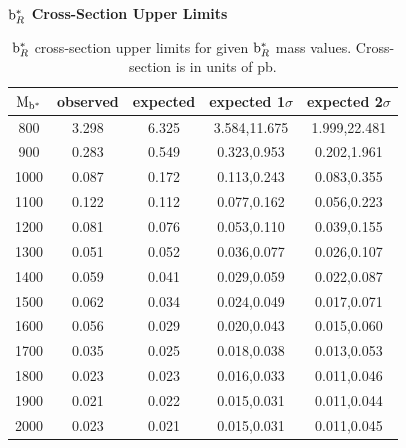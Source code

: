 \begin{table}
\begin{center}
\bf{$\mathrm{b}^{*}_R$ Cross-Section Upper Limits}\\
\begin{tabular}{|c||c|c|c|c|}
\hline
\bf{$\mathrm{M_{\mathrm{b}^{*}}}$} & \bf{observed}  & \bf{expected} & \bf{expected 1$\sigma$}  & \bf{expected 2$\sigma$} \\
\hline
\hline
800 & 3.298 & 6.325 & 3.584,11.675 & 1.999,22.481\\ 
\hline
900 & 0.283 & 0.549 & 0.323,0.953 & 0.202,1.961\\ 
\hline
1000 & 0.087 & 0.172 & 0.113,0.243 & 0.083,0.355\\ 
\hline
1100 & 0.122 & 0.112 & 0.077,0.162 & 0.056,0.223\\ 
\hline
1200 & 0.081 & 0.076 & 0.053,0.110 & 0.039,0.155\\ 
\hline
1300 & 0.051 & 0.052 & 0.036,0.077 & 0.026,0.107\\ 
\hline
1400 & 0.059 & 0.041 & 0.029,0.059 & 0.022,0.087\\ 
\hline
1500 & 0.062 & 0.034 & 0.024,0.049 & 0.017,0.071\\ 
\hline
1600 & 0.056 & 0.029 & 0.020,0.043 & 0.015,0.060\\ 
\hline
1700 & 0.035 & 0.025 & 0.018,0.038 & 0.013,0.053\\ 
\hline
1800 & 0.023 & 0.023 & 0.016,0.033 & 0.011,0.046\\ 
\hline
1900 & 0.021 & 0.022 & 0.015,0.031 & 0.011,0.044\\ 
\hline
2000 & 0.023 & 0.021 & 0.015,0.031 & 0.011,0.045\\ 
\hline
\end{tabular}
\end{center}
\caption{$\mathrm{b}^{*}_R$ cross-section upper limits for given $\mathrm{b}^{*}_R$ mass values.  Cross-section is in units of pb.}
\label{table:bsupperxsecR}
\end{table}

